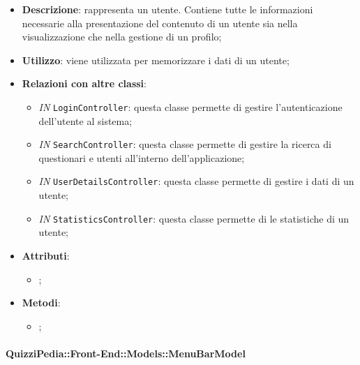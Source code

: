 		\begin{itemize}
			\item \textbf{Descrizione}: rappresenta un utente. Contiene tutte le informazioni necessarie alla
			presentazione del contenuto di un utente sia nella visualizzazione che nella gestione di un profilo;
			\item \textbf{Utilizzo}: viene utilizzata per memorizzare i dati di un utente;
			\item \textbf{Relazioni con altre classi}: 
			\begin{itemize}
				\item \textit{IN} \texttt{LoginController}: questa classe permette di gestire l'autenticazione dell'utente al sistema;
				\item \textit{IN} \texttt{SearchController}: questa classe permette di gestire la ricerca di questionari e utenti all'interno dell'applicazione;
				\item \textit{IN} \texttt{UserDetailsController}: questa classe permette di gestire i dati di un utente;
				\item \textit{IN} \texttt{StatisticsController}: questa classe permette di le statistiche di un utente;
			\end{itemize}
			\item \textbf{Attributi}: 
			\begin{itemize}
				\item ;
			\end{itemize}
			\item \textbf{Metodi}: 
			\begin{itemize}
				\item ;
			\end{itemize}
		\end{itemize}	
		
		\paragraph{QuizziPedia::Front-End::Models::MenuBarModel}
		
		\label{QuizziPedia::Front-End::Models::MenuBarModel}
		
		
